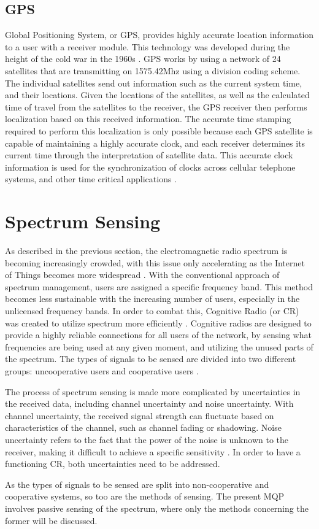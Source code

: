 \subsection{GPS}
Global Positioning System, or GPS, provides highly accurate location information to a user with a receiver module. This technology was developed during the height of the cold war in the 1960s \cite{gps_info}. GPS works by using a network of 24 satellites that are transmitting on 1575.42Mhz using a division coding scheme. The individual satellites send out information such as the current system time, and their locations. Given the locations of the satellites, as well as the calculated time of travel from the satellites to the receiver, the GPS receiver then performs localization based on this received information. The accurate time stamping required to perform this localization is only possible because each GPS satellite is capable of maintaining a highly accurate clock, and each receiver determines its current time through the interpretation of satellite data. This accurate clock information is used for the synchronization of clocks across cellular telephone systems, and other time critical applications \cite{GPS_Book}.

\section{Spectrum Sensing}
As described in the previous section, the electromagnetic radio spectrum is becoming increasingly crowded, with this issue only accelerating as the Internet of Things becomes more widespread \cite{sensing_iot}. With the conventional approach of spectrum management, users are assigned a specific frequency band. This method becomes less sustainable with the increasing number of users, especially in the unlicensed frequency bands. In order to combat this, Cognitive Radio (or CR) was created to utilize spectrum more efficiently \cite{wyglinski_book}. Cognitive radios are designed to provide a highly reliable connections for all users of the network, by sensing what frequencies are being used at any given moment, and utilizing the unused parts of the spectrum. The types of signals to be sensed are divided into two different groups: uncooperative users and cooperative users \cite{spectrum_sense_methods}. \par
The process of spectrum sensing is made more complicated by uncertainties in the received data, including channel uncertainty and noise uncertainty. With channel uncertainty, the received signal strength can fluctuate based on characteristics of the channel, such as channel fading or shadowing. Noise uncertainty refers to the fact that the power of the noise is unknown to the receiver, making it difficult to achieve a specific sensitivity \cite{spectrum_sense_methods}. In order to have a functioning CR, both uncertainties need to be addressed. \par
As the types of signals to be sensed are split into non-cooperative and cooperative systems, so too are the methods of sensing. The present MQP involves passive sensing of the spectrum, where only the methods concerning the former will be discussed.

